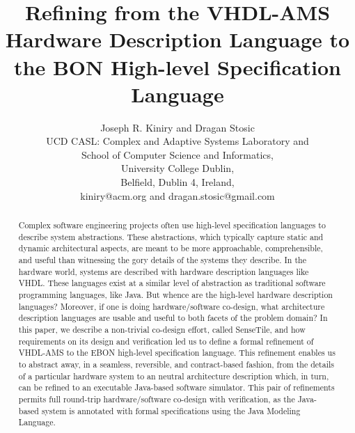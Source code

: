 \documentclass{article}
\begin{document}
\title{Refining from the VHDL-AMS Hardware Description Language 
to the BON High-level Specification Language}

\author{Joseph R. Kiniry and Dragan Stosic\\
UCD CASL: Complex and Adaptive Systems Laboratory and\\
School of Computer Science and Informatics,\\
University College Dublin,\\
Belfield, Dublin 4, Ireland,\\
kiniry@acm.org and dragan.stosic@gmail.com\\
}

\maketitle

\begin{abstract}

  Complex software engineering projects often use high-level
  specification languages to describe system abstractions.  These
  abstractions, which typically capture static and dynamic
  architectural aspects, are meant to be more approachable,
  comprehensible, and useful than witnessing the gory details of the
  systems they describe.  In the hardware world, systems are described
  with hardware description languages like VHDL.  These languages
  exist at a similar level of abstraction as traditional software
  programming languages, like Java.  But whence are the high-level
  hardware description languages?  Moreover, if one is doing
  hardware/software co-design, what architecture description languages
  are usable and useful to both facets of the problem domain?  In this
  paper, we describe a non-trivial co-design effort, called SenseTile,
  and how requirements on its design and verification led us to define
  a formal refinement of VHDL-AMS to the EBON high-level specification
  language.  This refinement enables us to abstract away, in a
  seamless, reversible, and contract-based fashion, from the details
  of a particular hardware system to an neutral architecture
  description which, in turn, can be refined to an executable
  Java-based software simulator.  This pair of refinements permits
  full round-trip hardware/software co-design with verification, as
  the Java-based system is annotated with formal specifications using
  the Java Modeling Language.

\end{abstract}
\end{document}

